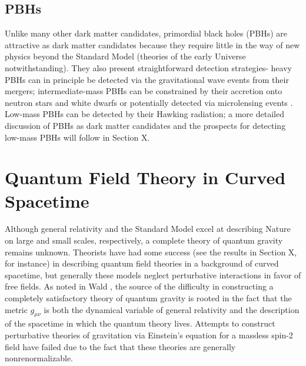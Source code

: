 \subsection{PBHs}
Unlike many other dark matter candidates, primordial black holes (PBHs) are attractive as dark matter candidates because they require little in the way of new physics beyond the Standard Model (theories of the early Universe notwithstanding). They also present straightforward detection strategies- heavy PBHs can in principle be detected via the gravitational wave events from their mergers; intermediate-mass PBHs can be constrained by their accretion onto neutron stars and white dwarfs \cite{pani_tidal_2014} or potentially detected via microlensing events \cite{carr_primordial_2016}. Low-mass PBHs can be detected by their Hawking radiation; a more detailed discussion of PBHs as dark matter candidates and the prospects for detecting low-mass PBHs will follow in Section X. 

\section{Quantum Field Theory in Curved Spacetime}
Although general relativity and the Standard Model excel at describing Nature on large and small scales, respectively, a complete theory of quantum gravity remains unknown. Theorists have had some success (see the results in Section X, for instance) in describing quantum field theories in a background of curved spacetime, but generally these models neglect perturbative interactions in favor of free fields. 
As noted in Wald \cite{wald_general_1984}, the source of the difficulty in constructing a completely satisfactory theory of quantum gravity is rooted in the fact that the metric $g_{\mu\nu}$ is both the dynamical variable of general relativity and the description of the spacetime in which the quantum theory lives.
Attempts to construct perturbative theories of gravitation via Einstein's equation for a massless spin-2 field have failed due to the fact that these theories are generally nonrenormalizable.

